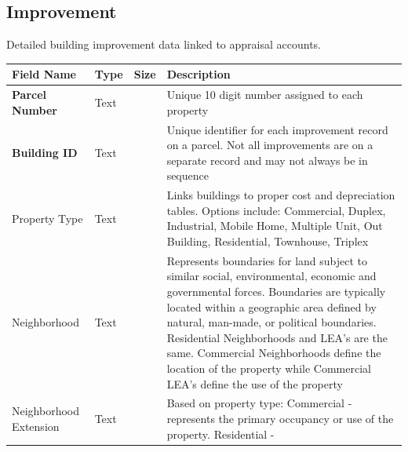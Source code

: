 \documentclass[
  english,
  letterpaper,
  DIV=11,
  numbers=noendperiod]{scrreprt}
\begin{document}
\subsection{Improvement}

Detailed building improvement data linked to appraisal accounts.

\begin{longtable}[]{@{}
  >{\raggedright\arraybackslash}p{}
  >{\raggedright\arraybackslash}p{}
  >{\raggedright\arraybackslash}p{}
  >{\raggedright\arraybackslash}p{}@{}}
\toprule\noalign{}
\begin{minipage}[b]{\linewidth}\raggedright
Field Name
\end{minipage} & \begin{minipage}[b]{\linewidth}\raggedright
Type
\end{minipage} & \begin{minipage}[b]{\linewidth}\raggedright
Size
\end{minipage} & \begin{minipage}[b]{\linewidth}\raggedright
Description
\end{minipage} \\
\midrule\noalign{}
\endhead
\bottomrule\noalign{}
\endlastfoot
\textbf{Parcel Number} & Text & 10 & Unique 10 digit number assigned to
each property \\
\textbf{Building ID} & Text & 5 & Unique identifier for each improvement
record on a parcel. Not all improvements are on a separate record and
may not always be in sequence \\
Property Type & Text & 15 & Links buildings to proper cost and
depreciation tables. Options include: Commercial, Duplex, Industrial,
Mobile Home, Multiple Unit, Out Building, Residential, Townhouse,
Triplex \\
Neighborhood & Text & 10 & Represents boundaries for land subject to
similar social, environmental, economic and governmental forces.
Boundaries are typically located within a geographic area defined by
natural, man-made, or political boundaries. Residential Neighborhoods
and LEA's are the same. Commercial Neighborhoods define the location of
the property while Commercial LEA's define the use of the property \\
Neighborhood Extension & Text & 10 & Based on property type: Commercial
- represents the primary occupancy or use of the property. Residential -

\end{longtable}
\end{document}
